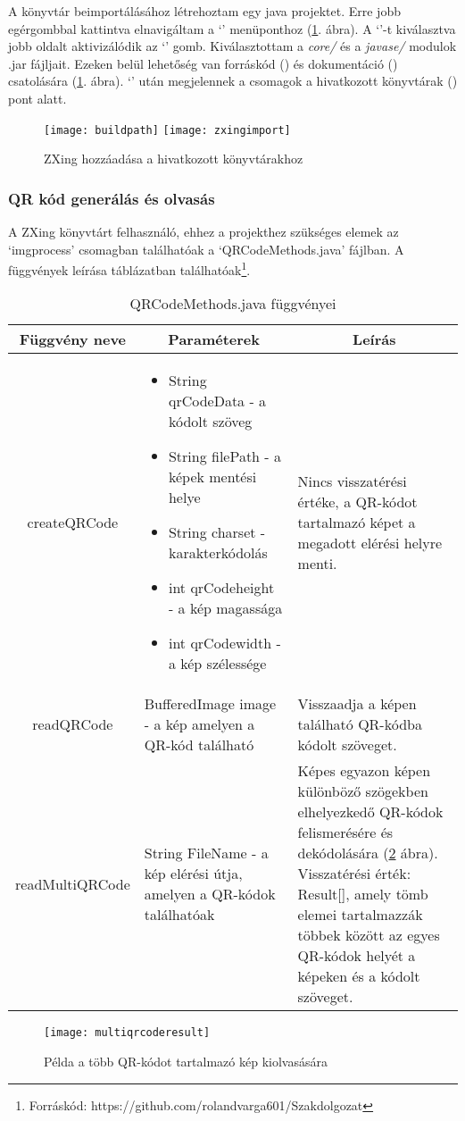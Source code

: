 \documentclass[../documentation.tex]{subfiles}
\begin{document}
A könyvtár beimportálásához létrehoztam egy java projektet. Erre jobb egérgombbal kattintva elnavigáltam a `' menüponthoz (\ref{fig:zxingimport}. ábra). A `'-t kiválasztva jobb oldalt aktivizálódik az `' gomb. Kiválasztottam a \textit{core/} és a \textit{javase/} modulok .jar fájljait. Ezeken belül lehetőség van forráskód () és dokumentáció () csatolására (\ref{fig:zxingimport}. ábra). `' után megjelennek a csomagok a hivatkozott könyvtárak () pont alatt.

\begin{figure}[h]
\centering
\texttt{[image: buildpath]}
\texttt{[image: zxingimport]}
\caption{ZXing hozzáadása a hivatkozott könyvtárakhoz}
\label{fig:zxingimport}
\end{figure}

\subsubsection{QR kód generálás és olvasás}
A ZXing könyvtárt felhasználó, ehhez a projekthez szükséges elemek az `imgprocess' csomagban találhatóak a `QRCodeMethods.java' fájlban. A függvények leírása   táblázatban találhatóak\footnote{Forráskód: https://github.com/rolandvarga601/Szakdolgozat}. 

\begin{table}[h]
\centering
\renewcommand\tabularxcolumn[1]{m{#1}}%
\begin{tabularx}{\linewidth}{|c|X|X|}
\hline \multicolumn{1}{|c|}{\textbf{Függvény neve}} & \multicolumn{1}{c|}{\textbf{Paraméterek}} & \multicolumn{1}{c|}{\textbf{Leírás}}\tabularnewline \hline
createQRCode & 
\begin{itemize} \item String qrCodeData - a kódolt szöveg
					\item String filePath - a képek mentési helye
					\item String charset - karakterkódolás
					\item int qrCodeheight - a kép magassága
					\item int qrCodewidth - a kép szélessége
\end{itemize} & Nincs visszatérési értéke, a QR-kódot tartalmazó képet a megadott elérési helyre menti. \tabularnewline \hline
readQRCode & BufferedImage image - a kép amelyen a QR-kód található & Visszaadja a képen található QR-kódba kódolt szöveget. \tabularnewline \hline
readMultiQRCode & String FileName - a kép elérési útja, amelyen a QR-kódok találhatóak & Képes egyazon képen különböző szögekben elhelyezkedő QR-kódok felismerésére és dekódolására (\ref{fig:multiqrcoderead} ábra). Visszatérési érték: Result[], amely tömb elemei tartalmazzák többek között az egyes QR-kódok helyét a képeken és a kódolt szöveget. \tabularnewline \hline
\end{tabularx}
\caption{QRCodeMethods.java függvényei}
\label{tab:qrcodemethods}
\end{table}

\begin{figure}[h]
\centering
{}
\texttt{[image: multiqrcoderesult]}
\caption{Példa a több QR-kódot tartalmazó kép kiolvasására}
\label{fig:multiqrcoderead}
\end{figure}
\end{document}
